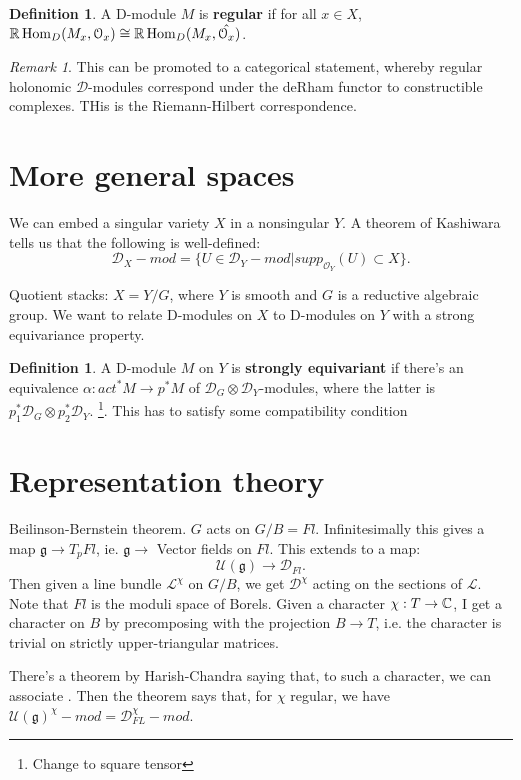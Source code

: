 \documentclass[10pt,a4paper,reqno,oneside]{book} %
\theoremstyle{plain}
\theoremstyle{definition}
\newtheorem{defin}[thm]{Definition}
\theoremstyle{remark}
\newtheorem{rem}[thm]{Remark}
\numberwithin{equation}{section}
\begin{document}
\begin{defin}
A D-module $M$ is \textbf{regular} if for all $x\in X$, $\mathbb R \operatorname{Hom}_D(M_x, \mathcal{O}_x) \cong \mathbb R \operatorname{Hom}_D(M_x, \hat{\mathcal{O}_x})$.
\end{defin}

\begin{rem}
This can be promoted to a categorical statement, whereby regular holonomic $\mathcal{D}$-modules correspond under the deRham functor
to constructible complexes. THis is the Riemann-Hilbert correspondence.
\end{rem}


\section{More general spaces}
We can embed a singular variety $X$ in a nonsingular $Y$. A theorem of Kashiwara tells us that the following is well-defined:
\[	\mathcal{D}_X -mod = \{ U \in \mathcal{D}_Y -mod| supp_{\mathcal{O}_Y}(U) \subset X \}.	\]

Quotient stacks: $X = Y / G$, where $Y$ is smooth and $G$ is a reductive algebraic group. We want to relate D-modules on $X$
to D-modules on $Y$ with a strong equivariance property.

\begin{defin}
A D-module $M$ on $Y$ is \textbf{strongly equivariant} if there's an equivalence $\alpha : act^* M \to p^* M$ of
$\mathcal{D}_G \otimes \mathcal{D}_Y$-modules, where the latter is $p_1^* \mathcal{D}_G \otimes p_2^* \mathcal{D}_Y$.
\footnote{Change to square tensor}. This has to satisfy some compatibility condition 
\end{defin}


\section{Representation theory}
Beilinson-Bernstein theorem. $G$ acts on $G/B = Fl$. Infinitesimally this gives a map $\mathfrak g \to T_p Fl$, ie.
$\mathfrak g \to $ Vector fields on $Fl$. This extends to a map:
\[	\mathcal{U}(\mathfrak g) \to \mathcal{D}_{Fl}.	\]
Then given a line bundle $\mathcal{L}^{\chi}$ on $G/B$, we get $\mathcal{D}^{\chi}$ acting on the sections of $\mathcal{L}$.
Note that $Fl$ is the moduli space of Borels. Given a character $\chi : T \to \mathbb C$, I get a character on $B$ by
precomposing with the projection $B\to T$, i.e. the character is trivial on strictly upper-triangular matrices.

There's a theorem by Harish-Chandra saying that, to such a character, we can associate . Then the theorem says that,
for $\chi$ regular, we have $\mathcal{U}(\mathfrak g)^{\chi}-mod = \mathcal{D}_{FL}^{\chi} - mod$.
\end{document}
